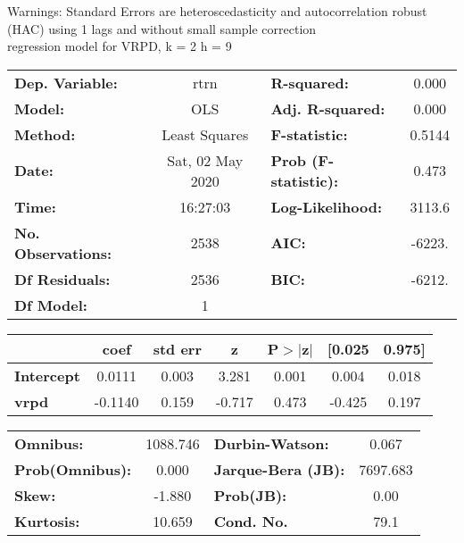 Warnings: \newline
 [1] Standard Errors are heteroscedasticity and autocorrelation robust (HAC) using 1 lags and without small sample correction\\ 

regression model for VRPD, k = 2 h = 9\begin{center}
\begin{tabular}{lclc}
\toprule
\textbf{Dep. Variable:}    &       rtrn       & \textbf{  R-squared:         } &     0.000   \\
\textbf{Model:}            &       OLS        & \textbf{  Adj. R-squared:    } &     0.000   \\
\textbf{Method:}           &  Least Squares   & \textbf{  F-statistic:       } &    0.5144   \\
\textbf{Date:}             & Sat, 02 May 2020 & \textbf{  Prob (F-statistic):} &    0.473    \\
\textbf{Time:}             &     16:27:03     & \textbf{  Log-Likelihood:    } &    3113.6   \\
\textbf{No. Observations:} &        2538      & \textbf{  AIC:               } &    -6223.   \\
\textbf{Df Residuals:}     &        2536      & \textbf{  BIC:               } &    -6212.   \\
\textbf{Df Model:}         &           1      & \textbf{                     } &             \\
\bottomrule
\end{tabular}
\begin{tabular}{lcccccc}
                   & \textbf{coef} & \textbf{std err} & \textbf{z} & \textbf{P$> |$z$|$} & \textbf{[0.025} & \textbf{0.975]}  \\
\midrule
\textbf{Intercept} &       0.0111  &        0.003     &     3.281  &         0.001        &        0.004    &        0.018     \\
\textbf{vrpd}      &      -0.1140  &        0.159     &    -0.717  &         0.473        &       -0.425    &        0.197     \\
\bottomrule
\end{tabular}
\begin{tabular}{lclc}
\textbf{Omnibus:}       & 1088.746 & \textbf{  Durbin-Watson:     } &    0.067  \\
\textbf{Prob(Omnibus):} &   0.000  & \textbf{  Jarque-Bera (JB):  } & 7697.683  \\
\textbf{Skew:}          &  -1.880  & \textbf{  Prob(JB):          } &     0.00  \\
\textbf{Kurtosis:}      &  10.659  & \textbf{  Cond. No.          } &     79.1  \\
\bottomrule
\end{tabular}
\end{center}


